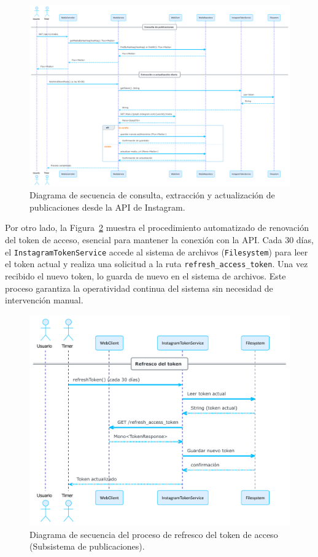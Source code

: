 \begin{figure}[h!tb]
    \centering
    \includegraphics[width=1\textwidth]{figs/secuencia_publicaciones_baja.pdf}
    \caption{Diagrama de secuencia de consulta, extracción y actualización de publicaciones desde la \gls{API} de Instagram.\label{fig:secuencia_publicaciones_consulta}}
\end{figure}

Por otro lado, la Figura~\ref{fig:secuencia_publicaciones_token} muestra el procedimiento automatizado de renovación del token de acceso, esencial para mantener la conexión con la \gls{API}. Cada 30 días, el \texttt{InstagramTokenService} accede al sistema de archivos (\texttt{Filesystem}) para leer el token actual y realiza una solicitud a la ruta \texttt{refresh\_access\_token}. Una vez recibido el nuevo token, lo guarda de nuevo en el sistema de archivos. Este proceso garantiza la operatividad continua del sistema sin necesidad de intervención manual.

\begin{figure}[h!tb]
    \centering
    \includegraphics[width=1\textwidth]{figs/secuencia_publicaciones_token.pdf}
    \caption{Diagrama de secuencia del proceso de refresco del token de acceso (Subsistema de publicaciones).\label{fig:secuencia_publicaciones_token}}
\end{figure}


